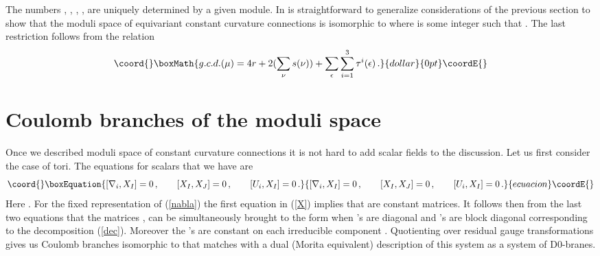 \documentclass[a4paper,a4paper]{article}
\begin{document}
{The numbers \coordHE{}, \coordHE{},  \coordHE{}, \myHighlight{$\zeta_{\nu}=\pm$}\coordHE{}, \coordHE{} are uniquely determined by 
a given module. In is straightforward to generalize considerations of the previous section to show that  the moduli 
space  of equivariant constant curvature connections is isomorphic to \coordHE{} where 
\coordHE{} is some integer such that \coordHE{}. The last restriction follows from the relation 
$$\coord{}\boxMath{
g.c.d. (\mu) = 4r + 2(\sum_{\nu} s(\nu) ) + \sum_{\epsilon}\sum_{i=1}^{3} \tau^{i}(\epsilon) \, . 
}{dollar}{0pt}\coordE{}$$ 


\section{ Coulomb branches of the moduli space}

Once we described moduli space of constant curvature connections it is not hard 
to add scalar fields to the discussion. Let us first consider the case of tori. The equations for scalars that we have are 
\begin{equation}\coord{}\boxEquation{ \label{X}
[\nabla_{i}, X_{I}]= 0 \, , \qquad [X_{I}, X_{J}]=0 \, , \qquad [U_{i}, X_{I}]=0 \, .
}{ [\nabla_{i}, X_{I}]= 0 \, , \qquad [X_{I}, X_{J}]=0 \, , \qquad [U_{i}, X_{I}]=0 \, .
}{ecuacion}\coordE{}\end{equation}
Here \coordHE{}. 
For the fixed representation of \coordHE{} (\ref{nabla}) the first equation in (\ref{X}) implies that
 \coordHE{} are constant \coordHE{} matrices. 
It follows then from the last two equations that the matrices \coordHE{}, \coordHE{} can be simultaneously brought 
to the form when \coordHE{}'s are diagonal and \coordHE{}'s are block diagonal corresponding to the decomposition 
(\ref{dec}). Moreover the \coordHE{}'s are constant on each irreducible component \coordHE{}. Quotienting 
over \coordHE{} residual gauge transformations gives us Coulomb branches isomorphic to \coordHE{} that 
matches with a dual (Morita equivalent) description of this system as a system
of \coordHE{} D0-branes. 


}
\end{document}
